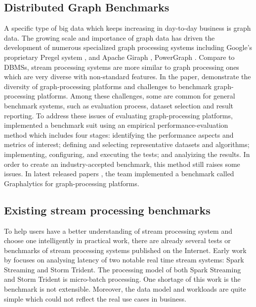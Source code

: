 \subsection{ Distributed Graph Benchmarks}

A specific type of big data which keeps increasing in day-to-day business is graph data. The growing scale and importance of graph data has driven the development of numerous specialized graph processing systems including Google's proprietary Pregel system \cite {Pregel}, and Apache Giraph  \cite{Giraph}, PowerGraph \cite{PowerGraph}. Compare to DBMSs, stream processing systems are more similar to graph processing ones which are very diverse with non-standard features. In the paper, \citet{guo2014benchmarking} demonstrate the diversity of graph-processing platforms and challenges to benchmark graph-processing platforms. Among these challenges, some are common for general benchmark systems, such as evaluation process, dataset selection and result reporting. To address these issues of evaluating graph-processing platforms, \citeauthor{guo2014well} implemented a benchmark suit using an empirical performance-evaluation method which includes four stages: identifying the performance aspects and metrics of interest; defining and selecting representative datasets and algorithms; implementing, configuring, and executing the tests; and analyizing the results. In order to create an industry-accepted benchmark, this method still raises some issues. In latest released papers \cite{iosup2014towards, capota2015graphalytics}, the team implemented a benchmark called Graphalytics for graph-processing platforms. 

\subsection{ Existing stream processing benchmarks}

To help users have a better understanding of stream processing system and choose one intelligently in practical work, there are already several tests or benchmarks of stream processing systems published on the Internet. Early work by \citet{cordovaanalysis} focuses on analysing latency of two notable real time stream systems: Spark Streaming and Storm Trident. The processing model of both Spark Streaming and Storm Trident is micro-batch processing. One shortage of this work is the benchmark is not extensible. Moreover, the data model and workloads are quite simple which could not reflect the real use cases in business. 

